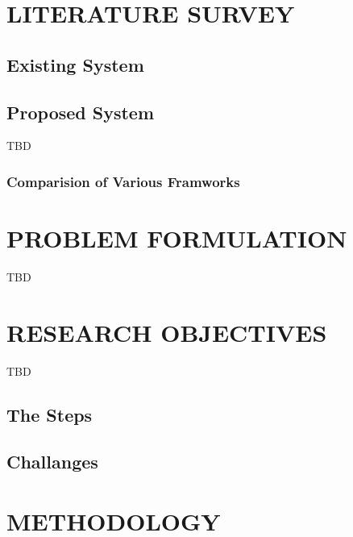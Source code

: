 \documentclass[14pt]{extarticle}
\begin{document}

\newpage


\newpage
\section{LITERATURE SURVEY}
\subsection{Existing System}

\newpage
\subsection{Proposed System}

\par TBD

\newpage
\subsubsection{Comparision of Various Framworks}

\newpage
\section{PROBLEM FORMULATION}

\par TBD

\newpage
\section{RESEARCH OBJECTIVES}

\par TBD

\newpage
\subsection{The Steps }

\newpage
\subsection{Challanges }

\section{METHODOLOGY}
\end{document}
